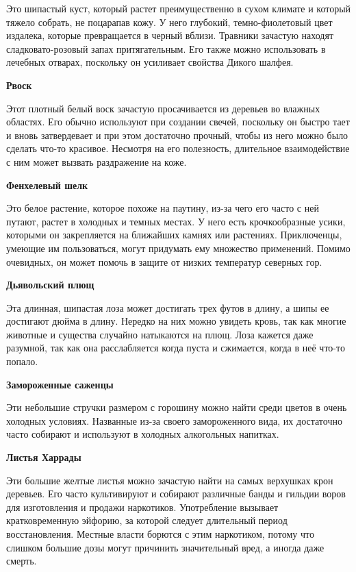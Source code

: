 \documentclass[a4paper, 9pt, twocolumn]{book}
\newcommand{\partc}[2][]{{
		\bigskip
		\noindent
		\hspace{-0.25cm}
		\fontsize{11pt}{13.2}
		\color{sectioncolor}
		\textbf{#2}}
	
	{
		\ifx\relax#1\relax
		\else
		\noindent
		\normalcolor
		\textbf{#1}}
	\bigskip
	\fi
}
\begin{document}
	\noindent Это шипастый куст, который растет преимущественно в сухом климате и который тяжело собрать, не поцарапав кожу. У него глубокий, темно-фиолетовый цвет издалека, которые превращается в черный вблизи. Травники зачастую находят сладковато-розовый запах притягательным. Его также можно использовать в лечебных отварах, поскольку он усиливает свойства Дикого шалфея.
	
	\partc{Рвоск}
	
	\noindent Этот плотный белый воск зачастую просачивается из деревьев во влажных областях. Его обычно используют при создании свечей, поскольку он быстро тает и вновь затвердевает и при этом достаточно прочный, чтобы из него можно было сделать что-то красивое. Несмотря на его полезность, длительное взаимодействие с ним может вызвать раздражение на коже.
	
	\partc{Фенхелевый шелк}
	
	Это белое растение, которое похоже на паутину, из-за чего его часто с ней путают, растет в холодных и темных местах. У него есть крочкообразные усики, которыми он закрепляется на ближайших камнях или растениях. Приключенцы, умеющие им пользоваться, могут придумать ему множество применений. Помимо очевидных, он может помочь в защите от низких температур северных гор.
	
	\partc{Дьявольский плющ}
	
	\noindent Эта длинная, шипастая лоза может достигать трех футов в длину, а шипы ее достигают дюйма в длину. Нередко на них можно увидеть кровь, так как многие животные и существа случайно натыкаются на плющ. Лоза кажется даже разумной, так как она расслабляется когда пуста и сжимается, когда в неё что-то попало.
	
	\partc{Замороженные саженцы}
	
	\noindent Эти небольшие стручки размером с горошину можно найти среди цветов в очень холодных условиях. Названные из-за своего замороженного вида, их достаточно часто собирают и используют в холодных алкогольных напитках.
	
	\partc{Листья Харрады}
	
	\noindent Эти большие желтые листья можно зачастую найти на самых верхушках крон деревьев.  Его часто культивируют и собирают различные банды и гильдии воров для изготовления и продажи наркотиков. Употребление вызывает кратковременную эйфорию, за которой следует длительный период восстановления. Местные власти борются с этим наркотиком, потому что слишком большие дозы могут причинить значительный вред, а иногда даже смерть.
	
\end{document}
